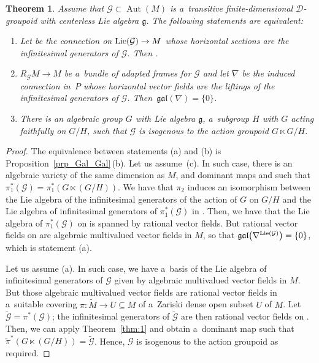 \documentclass[10pt,a4paper]{amsart}
\numberwithin{equation}{section}
\newtheorem{Theorem}{Theorem}[section]
\theoremstyle{definition}
\begin{document}
\begin{Theorem}\label{thm:2}
Assume that $\mathcal G\subset\operatorname{Aut}(M)$ is a~transitive finite-dimensional $\mathcal D$-groupoid with centerless Lie algebra $\mathfrak g$. The following statements are equivalent:
\begin{enumerate}\itemsep=0pt
\item[$(a)$] Let  be the connection on ${\rm Lie}(\mathcal G)\to M$ whose horizontal sections are the infinitesimal generators of $\mathcal G$. Then .
\item[$(b)$] $R_{\mathcal G}M\to M$ be a~bundle of adapted frames for $\mathcal G$ and let $\nabla$ be the induced connection in~$P$ whose horizontal vector fields are the liftings of the infinitesimal generators of $\mathcal G$. Then~${\mathfrak {gal}(\nabla) = \{0\}}$.
\item[$(c)$] There is an algebraic group $G$ with Lie algebra $\mathfrak g$, a~subgroup $H$ with $G$ acting faithfully on $G/H$, such that $\mathcal G$ is isogenous to the action groupoid $G\ltimes G/H$.
\end{enumerate}
\end{Theorem}


\begin{proof}
The equivalence between statements (a) and (b) is Proposition~\ref{prp_Gal_Gal}\,(b). Let us assume~(c). In such case, there is an algebraic variety  of the same dimension as $M$, and dominant maps  and  such that
$\pi_1^*(\mathcal G) = \pi_1^*(G\ltimes (G/H))$. We have that $\pi_2$ induces an isomorphism between the Lie algebra of the infinitesimal generators of the action of $G$ on $G/H$ and the Lie algebra of infinitesimal generators of $\pi_1^*(\mathcal G)$ in . Then, we have that the Lie algebra of $\pi_1^*(\mathcal G)$ on  is spanned by rational vector fields. But rational vector fields on  are algebraic multivalued vector fields in $M$, so that $\mathfrak{gal}\bigl(\nabla^{{\rm Lie}(\mathcal G)}\bigr) = \{0\}$, which is statement (a).

Let us assume (a). In such case, we have a~basis of the Lie algebra of infinitesimal generators of $\mathcal G$ given by algebraic multivalued vector fields in $M$. But those algebraic multivalued vector fields are rational vector fields in a~suitable covering $\pi\colon \widetilde M \to U \subseteq M$ of a~Zariski dense open subset $U$ of $M$.
Let $\widetilde{\mathcal G} = \pi^*(\mathcal G)$; the infinitesimal generators of $\widetilde{\mathcal G}$ are then rational vector fields on . Then, we can apply Theorem~\ref{thm:1} and obtain a~dominant map  such that~${\widetilde\pi^*(G\ltimes (G/H)) = \widetilde{\mathcal G}}$. Hence, $\mathcal G$ is isogenous to the action groupoid as required.
\end{proof}
\end{document}
